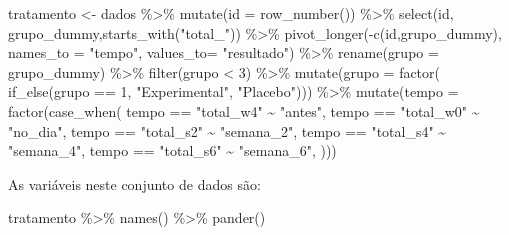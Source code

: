 \documentclass[
]{book}
\newenvironment{Shaded}{\begin{snugshade}}{\end{snugshade}}
\newcommand{\AttributeTok}[1]{\textcolor[rgb]{0.77,0.63,0.00}{#1}}
\newcommand{\DecValTok}[1]{\textcolor[rgb]{0.00,0.00,0.81}{#1}}
\newcommand{\FunctionTok}[1]{\textcolor[rgb]{0.00,0.00,0.00}{#1}}
\newcommand{\NormalTok}[1]{#1}
\newcommand{\OtherTok}[1]{\textcolor[rgb]{0.56,0.35,0.01}{#1}}
\newcommand{\SpecialCharTok}[1]{\textcolor[rgb]{0.00,0.00,0.00}{#1}}
\newcommand{\StringTok}[1]{\textcolor[rgb]{0.31,0.60,0.02}{#1}}
\begin{document}
\begin{Shaded}
\begin{Highlighting}[]
\NormalTok{tratamento }\OtherTok{\textless{}{-}}\NormalTok{ dados }\SpecialCharTok{\%\textgreater{}\%} 
  \FunctionTok{mutate}\NormalTok{(}\AttributeTok{id =} \FunctionTok{row\_number}\NormalTok{()) }\SpecialCharTok{\%\textgreater{}\%} 
  \FunctionTok{select}\NormalTok{(id, grupo\_dummy,}\FunctionTok{starts\_with}\NormalTok{(}\StringTok{"total\_"}\NormalTok{)) }\SpecialCharTok{\%\textgreater{}\%} 
  \FunctionTok{pivot\_longer}\NormalTok{(}\SpecialCharTok{{-}}\FunctionTok{c}\NormalTok{(id,grupo\_dummy),}
                \AttributeTok{names\_to =} \StringTok{"tempo"}\NormalTok{,}
               \AttributeTok{values\_to=} \StringTok{"resultado"}\NormalTok{) }\SpecialCharTok{\%\textgreater{}\%} 
  \FunctionTok{rename}\NormalTok{(}\AttributeTok{grupo =}\NormalTok{ grupo\_dummy) }\SpecialCharTok{\%\textgreater{}\%} 
  \FunctionTok{filter}\NormalTok{(grupo }\SpecialCharTok{\textless{}} \DecValTok{3}\NormalTok{) }\SpecialCharTok{\%\textgreater{}\%} 
  \FunctionTok{mutate}\NormalTok{(}\AttributeTok{grupo =} \FunctionTok{factor}\NormalTok{(}
    \FunctionTok{if\_else}\NormalTok{(grupo }\SpecialCharTok{==} \DecValTok{1}\NormalTok{, }\StringTok{"Experimental"}\NormalTok{, }\StringTok{"Placebo"}\NormalTok{))) }\SpecialCharTok{\%\textgreater{}\%} 
  \FunctionTok{mutate}\NormalTok{(}\AttributeTok{tempo =} \FunctionTok{factor}\NormalTok{(}\FunctionTok{case\_when}\NormalTok{(}
\NormalTok{    tempo }\SpecialCharTok{==} \StringTok{"total\_w4"} \SpecialCharTok{\textasciitilde{}} \StringTok{"antes"}\NormalTok{,}
\NormalTok{    tempo }\SpecialCharTok{==} \StringTok{"total\_w0"} \SpecialCharTok{\textasciitilde{}} \StringTok{"no\_dia"}\NormalTok{,}
\NormalTok{    tempo }\SpecialCharTok{==} \StringTok{"total\_s2"} \SpecialCharTok{\textasciitilde{}} \StringTok{"semana\_2"}\NormalTok{,}
\NormalTok{    tempo }\SpecialCharTok{==} \StringTok{"total\_s4"} \SpecialCharTok{\textasciitilde{}} \StringTok{"semana\_4"}\NormalTok{,}
\NormalTok{    tempo }\SpecialCharTok{==} \StringTok{"total\_s6"} \SpecialCharTok{\textasciitilde{}} \StringTok{"semana\_6"}\NormalTok{,}
\NormalTok{  )))}
\end{Highlighting}
\end{Shaded}

As variáveis neste conjunto de dados são:

\begin{Shaded}
\begin{Highlighting}[]
\NormalTok{tratamento }\SpecialCharTok{\%\textgreater{}\%} \FunctionTok{names}\NormalTok{() }\SpecialCharTok{\%\textgreater{}\%} \FunctionTok{pander}\NormalTok{()}
\end{Highlighting}
\end{Shaded}
\end{document}
